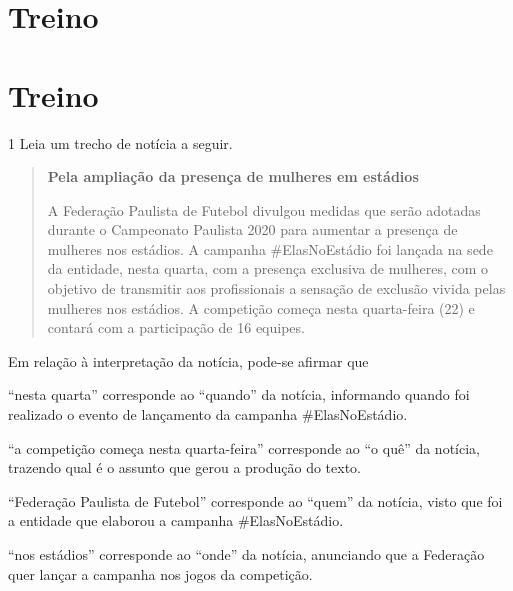 
\section{Treino}

\section{Treino}

\num{1} Leia um trecho de notícia a seguir.

\begin{quote}
\textbf{Pela ampliação da presença de mulheres em estádios}


A Federação Paulista de Futebol divulgou medidas que serão adotadas
durante o Campeonato Paulista 2020 para aumentar a presença de mulheres
nos estádios. A campanha \#ElasNoEstádio foi lançada na sede da
entidade, nesta quarta, com a presença exclusiva de mulheres, com o
objetivo de transmitir aos profissionais a sensação de exclusão vivida
pelas mulheres nos estádios. A competição começa nesta quarta-feira (22)
e contará com a participação de 16 equipes.

\end{quote}

Em relação à interpretação da notícia, pode-se afirmar que

\begin{escolha}
\item ``nesta quarta'' corresponde ao ``quando'' da notícia, informando
quando foi realizado o evento de lançamento da campanha \#ElasNoEstádio.

\item ``a competição começa nesta quarta-feira'' corresponde ao ``o quê''
da notícia, trazendo qual é o assunto que gerou a produção do texto.

\item ``Federação Paulista de Futebol'' corresponde ao ``quem'' da
notícia, visto que foi a entidade que elaborou a campanha
\#ElasNoEstádio.

\item ``nos estádios'' corresponde ao ``onde'' da notícia, anunciando que
a Federação quer lançar a campanha nos jogos da competição.
\end{escolha}


